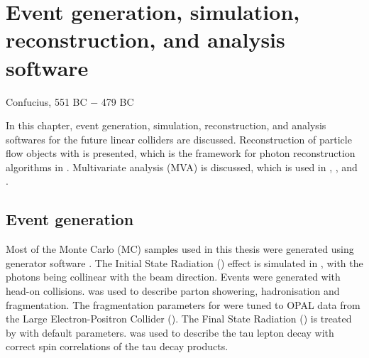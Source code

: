 \chapter{Event generation, simulation, reconstruction, and analysis software}
\label{chap:Reconstruction}

%
{Confucius, 551 BC $-$ 479 BC}%





In this chapter, event generation, simulation, reconstruction, and analysis softwares for the future linear colliders  are discussed. Reconstruction of particle flow objects with \pandora is presented, which is the framework for photon reconstruction algorithms in . Multivariate analysis (MVA) is discussed, which is used in , , and .


\section{Event generation}
\label{sec:pandoraMC}

Most of the Monte Carlo (MC) samples used in this thesis were generated using \WHIZARD generator software \cite{whizard,Moretti:2001zz}. The Initial State Radiation (\ISR) effect is simulated in \WHIZARD, with the \ISR photons being collinear with the beam direction. Events were generated with head-on collisions. \PYTHIA \cite{Sjostrand:1995iq} was used to describe parton showering, hadronisation and fragmentation. The fragmentation parameters for \PYTHIA were tuned to OPAL data \cite{Alexander:1995bk} from the Large Electron-Positron Collider (\LEP). The Final State Radiation (\FSR) is treated by \PYTHIA with default parameters. \TAUOLA \cite{Jadach:1993hs} was used to describe the tau lepton decay with correct spin correlations of the tau decay products.

